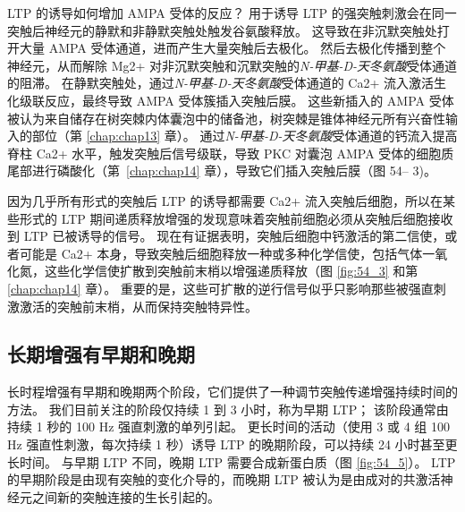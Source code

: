 LTP 的诱导如何增加 AMPA 受体的反应？
用于诱导 LTP 的强突触刺激会在同一突触后神经元的静默和非静默突触处触发谷氨酸释放。
这导致在非沉默突触处打开大量 AMPA 受体通道，进而产生大量突触后去极化。
然后去极化传播到整个神经元，从而解除 Mg2+ 对非沉默突触和沉默突触的\textit{N-甲基-D-天冬氨酸}受体通道的阻滞。
在静默突触处，通过\textit{N-甲基-D-天冬氨酸}受体通道的 Ca2+ 流入激活生化级联反应，最终导致 AMPA 受体簇插入突触后膜。
这些新插入的 AMPA 受体被认为来自储存在树突棘内体囊泡中的储备池，树突棘是锥体神经元所有兴奋性输入的部位（第 \ref{chap:chap13} 章）。
通过\textit{N-甲基-D-天冬氨酸}受体通道的钙流入提高脊柱 Ca2+ 水平，触发突触后信号级联，导致 PKC 对囊泡 AMPA 受体的细胞质尾部进行磷酸化（第~\ref{chap:chap14} 章），导致它们插入突触后膜（图 54– 3)。


因为几乎所有形式的突触后 LTP 的诱导都需要 Ca2+ 流入突触后细胞，所以在某些形式的 LTP 期间递质释放增强的发现意味着突触前细胞必须从突触后细胞接收到 LTP 已被诱导的信号。
现在有证据表明，突触后细胞中钙激活的第二信使，或者可能是 Ca2+ 本身，导致突触后细胞释放一种或多种化学信使，包括气体一氧化氮，这些化学信使扩散到突触前末梢以增强递质释放（图 \ref{fig:54_3} 和第 \ref{chap:chap14} 章）。
重要的是，这些可扩散的逆行信号似乎只影响那些被强直刺激激活的突触前末梢，从而保持突触特异性。



\subsection{长期增强有早期和晚期}

长时程增强有早期和晚期两个阶段，它们提供了一种调节突触传递增强持续时间的方法。
我们目前关注的阶段仅持续 1 到 3 小时，称为早期 LTP；
该阶段通常由持续 1 秒的 100 Hz 强直刺激的单列引起。
更长时间的活动（使用 3 或 4 组 100 Hz 强直性刺激，每次持续 1 秒）诱导 LTP 的晚期阶段，可以持续 24 小时甚至更长时间。
与早期 LTP 不同，晚期 LTP 需要合成新蛋白质（图 \ref{fig:54_5}）。
LTP 的早期阶段是由现有突触的变化介导的，而晚期 LTP 被认为是由成对的共激活神经元之间新的突触连接的生长引起的。


